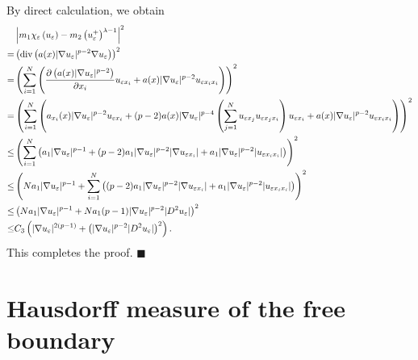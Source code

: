 \documentclass[onecolumn]{autart}
\newenvironment{proof}{{\it Proof: \enspace}}{\hfill $\blacksquare$\par}
\begin{document}
	\begin{proof}By direct calculation, we obtain
		\begin{align}
			&\left| m_1 \chi_\varepsilon\left( u_\varepsilon \right) - m_2 \left( u_{\varepsilon}^{+} \right)^{\lambda-1} \right|^2
			\notag\\ =
			& \left( \mathrm{div}\left(  a(x)|\nabla u_\varepsilon|^{p-2} \nabla u_\varepsilon \right)  \right)^2
			\notag\\=
			&\left( \sum^N_{i=1}\left( \frac{\partial \left( a(x) |\nabla u_\varepsilon|^{p-2}\right) }{\partial x_i} u_{\varepsilon x_i} + a(x)  |\nabla u_\varepsilon|^{p-2} u_{\varepsilon x_i x_i}\right) \right) ^2
			\notag\\=
			&\left( \sum^N_{i=1}\left( a_{x_i}(x) |\nabla u_\varepsilon|^{p-2}u_{\varepsilon x_i} + (p-2)a(x)|\nabla u_\varepsilon|^{p-4}\left( \sum^N_{j=1}u_{\varepsilon x_j}u_{\varepsilon x_j x_i}\right)u_{\varepsilon x_i} + a(x)  |\nabla u_\varepsilon|^{p-2} u_{\varepsilon x_i x_i}\right)\right)^2
			\notag\\ \leq
			&\left( \sum^N_{i=1}\left( a_1 |\nabla u_\varepsilon|^{p-1} + (p-2)a_1|\nabla u_\varepsilon|^{p-2}|\nabla u_{\varepsilon x_i}| + a_1  |\nabla u_\varepsilon|^{p-2} |u_{\varepsilon x_i x_i}|\right)\right)^2
			\notag\\ \leq
			&\left( N a_1 |\nabla u_\varepsilon|^{p-1} + \sum^N_{i=1}\left((p-2)a_1|\nabla u_\varepsilon|^{p-2}|\nabla u_{\varepsilon x_i}| + a_1  |\nabla u_\varepsilon|^{p-2}| u_{\varepsilon x_i x_i}|\right)\right)^2
			\notag\\ \leq
			&\left( N a_1 |\nabla u_\varepsilon|^{p-1} + Na_1(p-1)|\nabla u_\varepsilon|^{p-2} |D^2 u_\varepsilon| \right)^2 \label{1111}
			\\ \leq
			& C_3\left(  |\nabla u_\varepsilon|^{2(p-1)}  + \left( |\nabla u_\varepsilon|^{p-2} |D^2 u_\varepsilon| \right)^2\right) . \notag
		\end{align}
		This completes the proof.
	\end{proof}
	
	
	
	
	
	
	
	
	
	
	
	
	
	
	
	
	
	
	
	
	
	
	
	
	\section{Hausdorff measure of the free boundary}\label{Sec.7}
	
\end{document}
